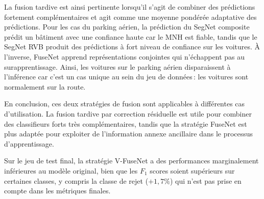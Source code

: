 La fusion tardive est ainsi pertinente lorsqu'il s'agit de combiner des prédictions fortement complémentaires et agit comme une moyenne pondérée adaptative des prédictions. Pour les cas du parking aérien, la prédiction du SegNet composite prédit un bâtiment avec une confiance haute car le \gls{MNH} est fiable, tandis que le SegNet \gls{RVB} produit des prédictions à fort niveau de confiance sur les voitures. À l'inverse, FuseNet apprend représentations conjointes qui n'échappent pas au surapprentissage. Ainsi, les voitures sur le parking aérien disparaissent à l'inférence car c'est un cas unique au sein du jeu de données\,: les voitures sont normalement sur la route.

En conclusion, ces deux stratégies de fusion sont applicables à différentes cas d'utilisation. La fusion tardive par correction résiduelle est utile pour combiner des classifieurs forts très complémentaires, tandis que la stratégie FuseNet est plus adaptée pour exploiter de l'information annexe ancillaire dans le processus d'apprentissage.

Sur le jeu de test final, la stratégie V-FuseNet a des performances marginalement inférieures au modèle original, bien que les $F_1$ scores soient supérieurs sur certaines classes, y compris la classe de rejet ($+1,7\%$) qui n'est pas prise en compte dans les métriques finales.

